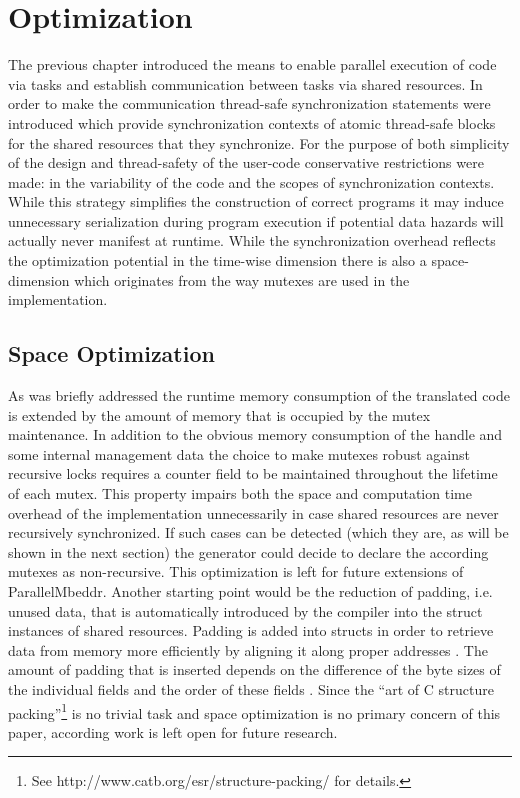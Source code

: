 \chapter{Optimization}
The previous chapter introduced the means to enable parallel execution of code via tasks and establish communication between tasks via shared resources. In order to make the communication thread-safe synchronization statements were introduced which provide synchronization contexts of atomic thread-safe blocks for the shared resources that they synchronize. For the purpose of both simplicity of the design and thread-safety of the user-code conservative restrictions were made: in the variability of the code and the scopes of synchronization contexts. While this strategy simplifies the construction of correct programs it may induce unnecessary serialization during program execution if potential data hazards will actually never manifest at runtime\cite{SpeculativeLockElision}. While the synchronization overhead reflects the optimization potential in the time-wise dimension there is also a space-dimension which originates from the way mutexes are used in the implementation. 

\section{Space Optimization}
As was briefly addressed the runtime memory consumption of the translated code is extended by the amount of memory that is occupied by the mutex maintenance. In addition to the obvious memory consumption of the handle and some internal management data the choice to make mutexes robust against recursive locks requires a counter field to be maintained throughout the lifetime of each mutex. This property impairs both the space and computation time overhead of the implementation unnecessarily in case shared resources are never recursively synchronized. If such cases can be detected (which they are, as will be shown in the next section) the generator could decide to declare the according mutexes as non-recursive. This optimization is left for future extensions of ParallelMbeddr. Another starting point would be the reduction of padding, i.e. unused data, that is automatically introduced by the compiler into the struct instances of shared resources. Padding is added into structs in order to retrieve data from memory more efficiently by aligning it along proper addresses \cite[p.~27]{MemoryAsAProgrammingConcept}. The amount of padding that is inserted depends on the difference of the byte sizes of the individual fields and the order of these fields \cite{MemoryAsAProgrammingConcept}. Since the ``art of C structure packing''\footnote{See http://www.catb.org/esr/structure-packing/ for details.} is no trivial task and space optimization is no primary concern of this paper, according work is left open for future research.



